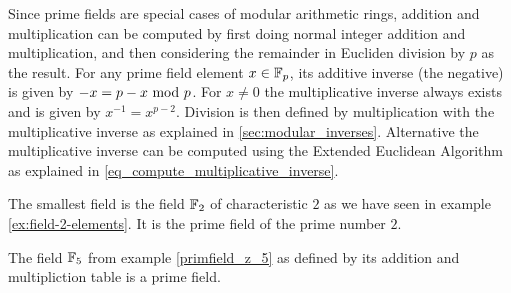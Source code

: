 Since prime fields are special cases of modular arithmetic rings, addition and multiplication can be computed by first doing normal integer addition and multiplication, and then considering the remainder in Eucliden division by $p$ as the result. For any prime field element $x\in \mathbb{F}_p$, its additive inverse (the negative) is given by $-x=p-x \text{ mod } p$. For $x\neq 0$ the multiplicative inverse always exists and is given by $x^{-1}=x^{p-2}$. Division is then defined by multiplication with the multiplicative inverse as explained in \ref{sec:modular_inverses}. Alternative the multiplicative inverse can be computed using the Extended Euclidean Algorithm as explained in \ref{eq_compute_multiplicative_inverse}.

\begin{example}
The smallest field is the field $\mathbb{F}_2$ of characteristic $2$ as we have seen in example \ref{ex:field-2-elements}. It is the prime field of the prime number $2$.
\end{example}
\begin{example}
The field $\mathbb{F}_5$ from example \ref{primfield_z_5} as defined by its addition and multipliction table is a prime field. 
\end{example}
